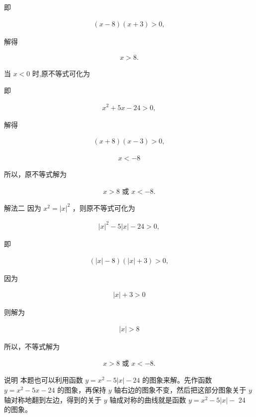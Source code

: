 \documentclass[10pt]{article}
\begin{document}
即

\begin{align*}
(x-8)(x+3)>0,
\end{align*}

解得

\begin{align*}
x>8 .
\end{align*}

当 $x<0$ 时,原不等式可化为

即

\begin{align*}
x^{2}+5 x-24>0,
\end{align*}

解得

\begin{align*}
(x+8)(x-3)>0,
\end{align*}

\begin{align*}
x<-8
\end{align*}

所以，原不等式解为

\begin{align*}
x>8 \text { 或 } x<-8 .
\end{align*}

解法二 因为 $x^{2}=|x|^{2}$ ，则原不等式可化为

\begin{align*}
|x|^{2}-5|x|-24>0,
\end{align*}

即

\begin{align*}
(|x|-8)(|x|+3)>0,
\end{align*}

因为

\begin{align*}
|x|+3>0
\end{align*}

则解为

\begin{align*}
|x|>8
\end{align*}

所以，不等式解为

\begin{align*}
x>8 \text { 或 } x<-8 .
\end{align*}

说明 本题也可以利用函数 $y=x^{2}-5|x|-24$ 的图象来解。先作函数 $y=x^{2}-5 x-24$ 的图象，再保持 $y$ 轴右边的图象不变，然后把这部分图象关于 $y$ 轴对称地翻到左边，得到的关于 $y$ 轴成对称的曲线就是函数 $y=x^{2}-5|x|-$ 24 的图象。
\end{document}
